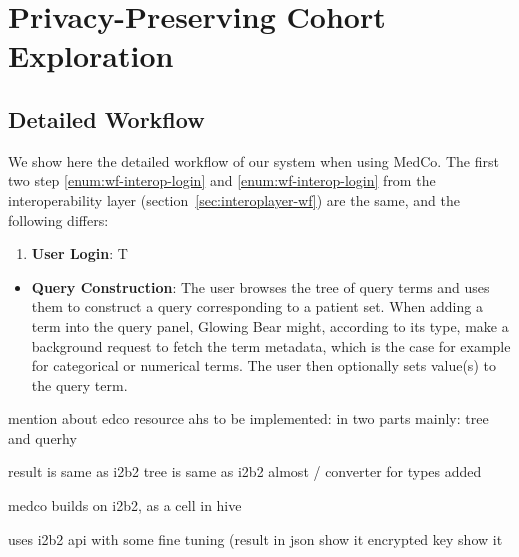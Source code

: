 \chapter{Privacy-Preserving Cohort Exploration}
\label{sec:medco}




\section{Detailed Workflow}

We show here the detailed workflow of our system when using MedCo.
The first two step \ref{enum:wf-interop-login} and \ref{enum:wf-interop-login} from the interoperability layer (section~\ref{sec:interoplayer-wf}) are the same, and the following differs:

\begin{enumerate}
\item \textbf{User Login}:
T

\end{enumerate}


\begin{itemize}
\item \textbf{Query Construction}:
The user browses the tree of query terms and uses them to construct a query corresponding to a patient set.
When adding a term into the query panel, Glowing Bear might, according to its type, make a background request to fetch the term metadata, which is the case for example for categorical or numerical terms.
The user then optionally sets value(s) to the query term.

\end{itemize}

mention about edco resource ahs to be implemented: in two parts mainly: tree and querhy

result is same as i2b2
tree is same as i2b2 almost / converter for types added

medco builds on i2b2, as a cell in hive 

uses i2b2 api with some fine tuning 
(result in json show it 
encrypted key show it

